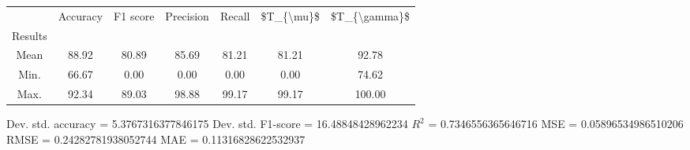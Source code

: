 \begin{tabular}{|c|c|c|c|c|c|c|}
\toprule
{} &  Accuracy &  F1 score &  Precision &  Recall &  \$T\_\{\textbackslash mu\}\$ &  \$T\_\{\textbackslash gamma\}\$ \\
Results &           &           &            &         &            &               \\
\hline
Mean    &     88.92 &     80.89 &      85.69 &   81.21 &      81.21 &         92.78 \\
Min.    &     66.67 &      0.00 &       0.00 &    0.00 &       0.00 &         74.62 \\
Max.    &     92.34 &     89.03 &      98.88 &   99.17 &      99.17 &        100.00 \\
\bottomrule
\end{tabular}

 Dev. std. accuracy = 5.3767316377846175
 Dev. std. F1-score = 16.48848428962234
 $R^2$ = 0.7346556365646716
 MSE = 0.05896534986510206
 RMSE = 0.24282781938052744
 MAE = 0.11316828622532937